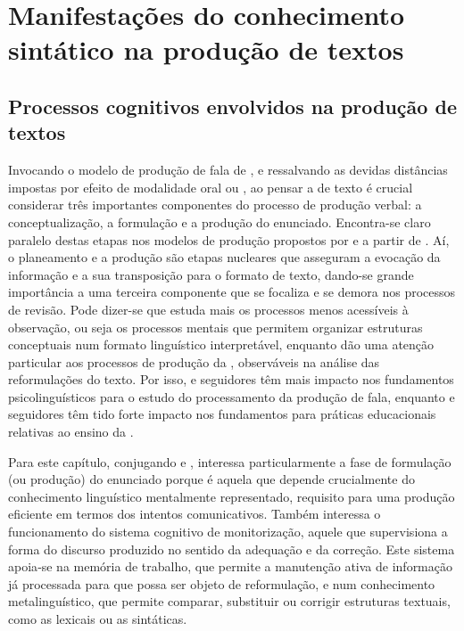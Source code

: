 \documentclass[output=paper]{LSP/langsci}
\begin{document}
\section{Manifestações do conhecimento sintático na produção de textos}
\label{sec:costacostagoncalves_manif_textos}

\subsection{Processos cognitivos envolvidos na produção de textos}
\label{subsec:costacostagoncalves_cog_textos}

Invocando o modelo de produção de fala de \citet{levelt1989}, e ressalvando as devidas distâncias impostas por efeito de modalidade oral ou , ao pensar a  de texto é crucial considerar três importantes componentes do processo de produção verbal: a conceptualização, a formulação e a produção do enunciado. Encontra-se claro paralelo destas etapas nos modelos de produção  propostos por e a partir de \citet{flowerhayes1981}. Aí, o planeamento e a produção são etapas nucleares que asseguram a evocação da informação e a sua transposição para o formato de texto, dando-se grande importância a uma terceira componente que se focaliza e se demora nos processos de revisão. Pode dizer-se que \citeauthor{levelt1989} estuda mais os processos menos acessíveis à observação, ou seja os processos mentais que permitem organizar estruturas conceptuais num formato linguístico interpretável, enquanto \citeauthor{flowerhayes1981} dão uma atenção particular aos processos de produção da , observáveis na análise das reformulações do texto. Por isso, \citeauthor{levelt1989} e seguidores têm mais impacto nos fundamentos psicolinguísticos para o estudo do processamento da produção de fala, enquanto \citeauthor{flowerhayes1981} e seguidores têm tido forte impacto nos fundamentos para práticas educacionais relativas ao ensino da .

Para este capítulo, conjugando \citet{levelt1989} e \citet{flowerhayes1981}, interessa particularmente a fase de formulação (ou produção) do enunciado porque é aquela que depende crucialmente do conhecimento linguístico mentalmente representado, requisito para uma produção eficiente em termos dos intentos comunicativos. Também interessa o funcionamento do sistema cognitivo de monitorização, aquele que supervisiona a forma do discurso produzido no sentido da adequação e da correção. Este sistema apoia‑se na memória de trabalho, que permite a manutenção ativa de informação já processada para que possa ser objeto de reformulação, e num conhecimento metalinguístico, que permite comparar, substituir ou corrigir estruturas textuais, como as lexicais ou as sintáticas. 
\end{document}
